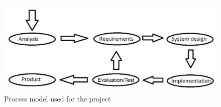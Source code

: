 \begin{figure}[h]
	\centering
	\includegraphics[scale=0.30]{billeder/process-model}
	\caption{Process model used for the project}
	\label{pm}
\end{figure}